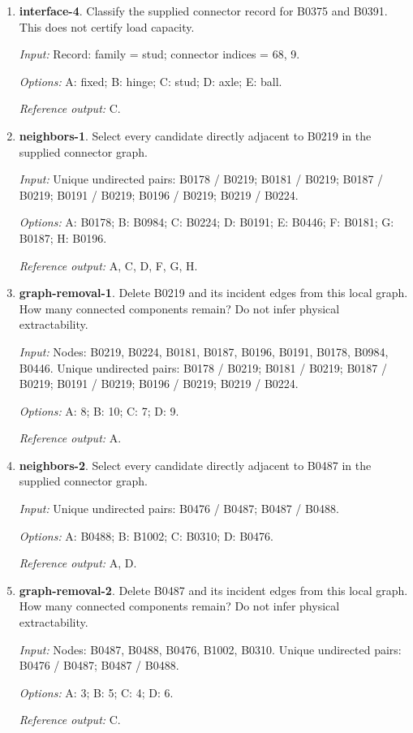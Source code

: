 \begin{enumerate}
\item \textbf{interface-4}. Classify the supplied connector record for B0375 and B0391. This does not certify load capacity.\par {\small \textit{Input:} Record: family = stud; connector indices = 68, 9. \par\textit{Options:} A: fixed; B: hinge; C: stud; D: axle; E: ball. \par\textit{Reference output:} C.}
\item \textbf{neighbors-1}. Select every candidate directly adjacent to B0219 in the supplied connector graph.\par {\small \textit{Input:} Unique undirected pairs: B0178 / B0219; B0181 / B0219; B0187 / B0219; B0191 / B0219; B0196 / B0219; B0219 / B0224. \par\textit{Options:} A: B0178; B: B0984; C: B0224; D: B0191; E: B0446; F: B0181; G: B0187; H: B0196. \par\textit{Reference output:} A, C, D, F, G, H.}
\item \textbf{graph-removal-1}. Delete B0219 and its incident edges from this local graph. How many connected components remain? Do not infer physical extractability.\par {\small \textit{Input:} Nodes: B0219, B0224, B0181, B0187, B0196, B0191, B0178, B0984, B0446. Unique undirected pairs: B0178 / B0219; B0181 / B0219; B0187 / B0219; B0191 / B0219; B0196 / B0219; B0219 / B0224. \par\textit{Options:} A: 8; B: 10; C: 7; D: 9. \par\textit{Reference output:} A.}
\item \textbf{neighbors-2}. Select every candidate directly adjacent to B0487 in the supplied connector graph.\par {\small \textit{Input:} Unique undirected pairs: B0476 / B0487; B0487 / B0488. \par\textit{Options:} A: B0488; B: B1002; C: B0310; D: B0476. \par\textit{Reference output:} A, D.}
\item \textbf{graph-removal-2}. Delete B0487 and its incident edges from this local graph. How many connected components remain? Do not infer physical extractability.\par {\small \textit{Input:} Nodes: B0487, B0488, B0476, B1002, B0310. Unique undirected pairs: B0476 / B0487; B0487 / B0488. \par\textit{Options:} A: 3; B: 5; C: 4; D: 6. \par\textit{Reference output:} C.}

\end{enumerate}
